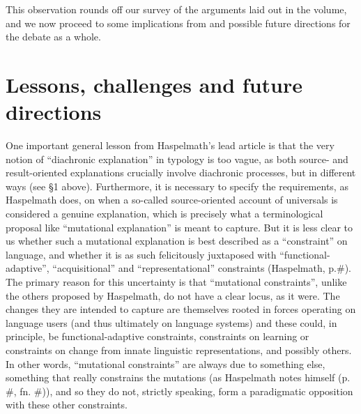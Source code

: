 \documentclass[output=paper]{langsci/langscibook}
\begin{document}
This observation rounds off our survey of the arguments laid out in the volume, and we now proceed to some implications from and possible future directions for the debate as a whole.

\section{Lessons, challenges and future directions}

One important general lesson from Haspelmath’s lead article is that the very notion of “diachronic explanation” in typology is too vague, as both source- and result-oriented explanations crucially involve diachronic processes, but in different ways (see §1 above). Furthermore, it is necessary to specify the requirements, as Haspelmath does, on when a so-called source-oriented account of universals is considered a genuine explanation, which is precisely what a terminological proposal like “mutational explanation” is meant to capture. But it is less clear to us whether such a mutational explanation is best described as a “constraint” on language, and whether it is as such felicitously juxtaposed with “functional-adaptive”, “acquisitional” and “representational” constraints (Haspelmath, p.\#). The primary reason for this uncertainty is that “mutational constraints”, unlike the others proposed by Haspelmath, do not have a clear locus, as it were. The changes they are intended to capture are themselves rooted in forces operating on language users (and thus ultimately on language systems) and these could, in principle, be functional-adaptive constraints, constraints on learning or constraints on change from innate linguistic representations, and possibly others. In other words, “mutational constraints” are always due to something else, something that really constrains the mutations (as Haspelmath notes himself (p. \#, fn. \#)), and so they do not, strictly speaking, form a paradigmatic opposition with these other constraints.
\end{document}
